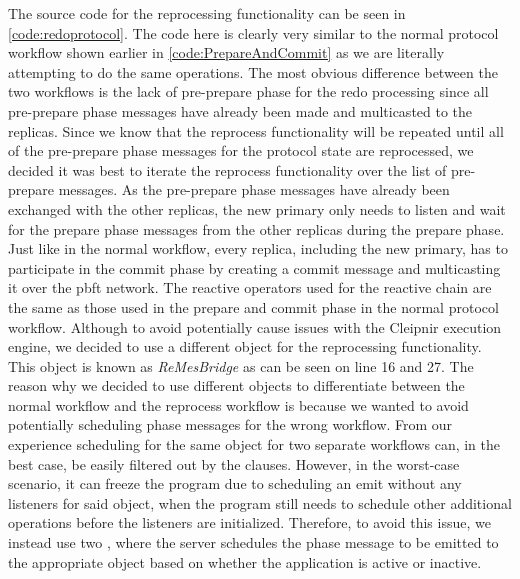 The source code for the reprocessing functionality can be seen in \autoref{code:redoprotocol}. The code here is clearly very similar to the normal protocol workflow shown earlier in \autoref{code:PrepareAndCommit} as we are literally attempting to do the same operations. The most obvious difference between the two workflows is the lack of pre-prepare phase for the redo processing since all pre-prepare phase messages have already been made and multicasted to the replicas. Since we know that the reprocess functionality will be repeated until all of the pre-prepare phase messages for the protocol state are reprocessed, we decided it was best to iterate the reprocess functionality over the list of pre-prepare messages. As the pre-prepare phase messages have already been exchanged with the other replicas, the new primary only needs to listen and wait for the prepare phase messages from the other replicas during the prepare phase. Just like in the normal workflow, every replica, including the new primary, has to participate in the commit phase by creating a commit message and multicasting it over the \ac{pbft} network. The reactive operators used for the reactive chain are the same as those used in the prepare and commit phase in the normal protocol workflow. Although to avoid potentially cause issues with the Cleipnir execution engine, we decided to use a different  object for the reprocessing functionality. This  object is known as \emph{ReMesBridge} as can be seen on line 16 and 27. The reason why we decided to use different  objects to differentiate between the normal workflow and the reprocess workflow is because we wanted to avoid potentially scheduling phase messages for the wrong workflow. From our experience scheduling for the same  object for two separate workflows can, in the best case, be easily filtered out by the  clauses. However, in the worst-case scenario, it can freeze the program due to scheduling an emit without any listeners for said  object, when the program still needs to schedule other additional operations before the listeners are initialized. Therefore, to avoid this issue, we instead use two , where the server schedules the phase message to be emitted to the appropriate  object based on whether the application is active or inactive. 

